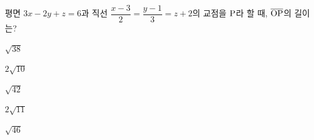 평면 $3x-2y+z=6$과 직선 $\dfrac{x-3}{2}=\dfrac{y-1}{3}=z+2$의 교점을 $\mathrm{P}$라 할 때, $\overline{\mathrm{OP}}$의 길이는? 
\begin{choices32}{\rule[-3ex]{0pt}{8ex}$\sqrt{38}$}{\rule[-3ex]{0pt}{8ex}$2\sqrt{10}$}{\rule[-3ex]{0pt}{8ex}$\sqrt{42}$}{\rule[-3ex]{0pt}{8ex}$2\sqrt{11}$}{\rule[-3ex]{0pt}{8ex}$\sqrt{46}$}\end{choices32}
